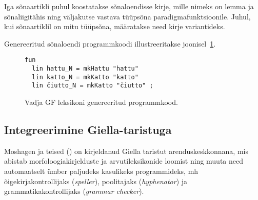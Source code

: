\documentclass[12pt,a4paper]{article}
\begin{document}
Iga sõnaartikli puhul koostatakse sõnaloendisse kirje, mille nimeks on lemma ja sõnaliigi\-tähis ning väljakutse vastava tüüpsõna paradigma\-funktsioonile. Juhul, kui sõna\-artiklil on mitu tüüpsõna, määratakse need kirje variantideks.


Genereeritud sõnaloendi programm\-koodi illustreeritakse joonisel~\ref{code:gf-lexicon}. %

\begin{figure}[ht]
  \center
  \begin{verbatim}
fun
  lin hattu_N = mkHattu "hattu"
  lin katto_N = mkKatto "katto"
  lin čiutto_N = mkKatto "čiutto" ;
\end{verbatim}
\caption{Vadja GF leksikoni genereeritud programmkood.
  \label{code:gf-lexicon}}
\end{figure}








\subsection{Integreerimine Giella-taristuga}
\label{sec:giella}
% 


Moshagen ja teised (\citeyear[344]{moshagen_building_2013}) on kirjeldanud Giella taristut arendus\-keskkonnana, mis abistab morfoloogia\-kirjelduste ja arvuti\-leksikonide loomist ning muuta need automaatselt ümber paljudeks kasulikeks programmideks, mh õige\-kirja\-kontrollijaks (\textit{speller}), poolitajaks (\textit{hyphenator}) ja grammatika\-kontrollijaks (\textit{grammar checker}). 
\end{document}
